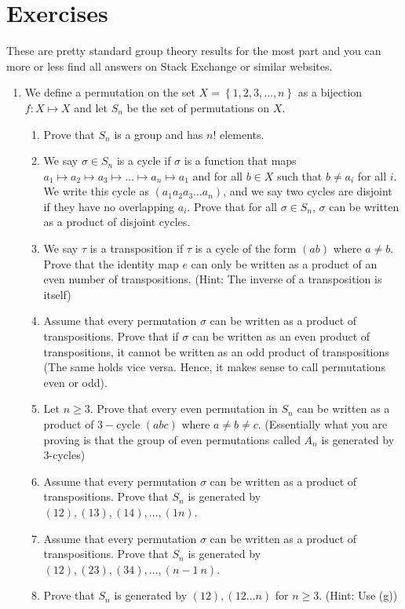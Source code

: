 \documentclass[letterpaper,12pt]{article}
\newcommand{\set}[1]{\left\{ #1 \right\}}
\begin{document}
\section{Exercises}
These are pretty standard group theory results for the most part and you can more or less find all answers on Stack Exchange or similar websites.
\begin{enumerate}
    \item We define a permutation on the set $X=\set{1,2,3,\ldots,n}$ as a bijection $f: X \mapsto X$ and let $S_n$ be the set of permutations on $X$. \begin{enumerate}
    \item Prove that $S_n$ is a group and has $n!$ elements.
    \item We say $\sigma \in S_n$ is a cycle if $\sigma$ is a function that maps $a_1 \mapsto a_2 \mapsto a_3 \mapsto \ldots \mapsto a_n \mapsto a_1$ and for all $b \in X$ such that $b \neq a_i$ for all $i$. We write this cycle as $(a_1 a_2 a_3 \ldots a_n)$, and we say two cycles are disjoint if they have no overlapping $a_i$. Prove that for all $\sigma \in S_n$, $\sigma$ can be written as a product of disjoint cycles.
    \item We say $\tau$ is a transposition if $\tau$ is a cycle of the form $(ab)$ where $a \neq b$. Prove that the identity map $e$ can only be written as a product of an even number of transpositions. (Hint: The inverse of a transposition is itself)
    \item Assume that every permutation $\sigma$ can be written as a product of transpositions. Prove that if $\sigma$ can be written as an even product of transpositions, it cannot be written as an odd product of transpositions (The same holds vice versa. Hence, it makes sense to call permutations even or odd).
    \item Let $n \geq 3$. Prove that every even permutation in $S_n$ can be written as a product of $3-$cycle $(abc)$ where $a\neq b \neq c$. (Essentially what you are proving is that the group of even permutations called $A_n$ is generated by 3-cycles)
    \item Assume that every permutation $\sigma$ can be written as a product of transpositions. Prove that $S_n$ is generated by $(12),(13),(14),\ldots,(1n)$.
    \item  Assume that every permutation $\sigma$ can be written as a product of transpositions. Prove that $S_n$ is generated by $(12),(23),(34),\ldots,(n-1 \ n)$.
    \item Prove that $S_n$ is generated by $(12),(12\ldots n)$ for $n\geq 3$. (Hint: Use (g))

\end{enumerate}
\end{enumerate}
\end{document}
